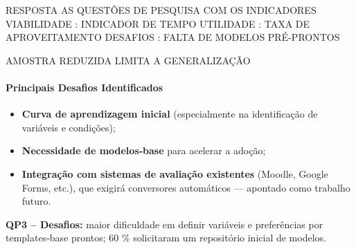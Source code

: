 RESPOSTA AS QUESTÕES DE PESQUISA COM OS INDICADORES 
VIABILIDADE : INDICADOR DE TEMPO
UTILIDADE : TAXA DE APROVEITAMENTO 
DESAFIOS : FALTA DE MODELOS PRÉ-PRONTOS

AMOSTRA REDUZIDA LIMITA A GENERALIZAÇÃO



\paragraph{\textbf{Principais Desafios Identificados}}

\begin{itemize}
    \item \textbf{Curva de aprendizagem inicial} (especialmente na identificação de variáveis e condições);
    \item \textbf{Necessidade de modelos‐base} para acelerar a adoção;
    \item \textbf{Integração com sistemas de avaliação existentes} (Moodle, Google Forms, etc.), que exigirá conversores automáticos — apontado como trabalho futuro.
\end{itemize}
\textbf{QP3 – Desafios:} maior dificuldade em definir variáveis e preferências por templates‐base prontos; 60 \% solicitaram um repositório inicial de modelos. 